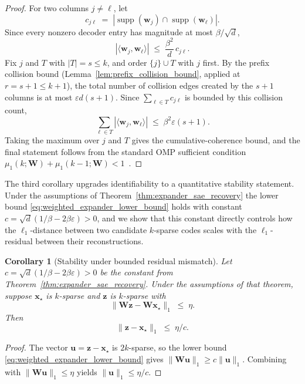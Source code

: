 \documentclass{article}
\theoremstyle{plain}
\newtheorem{corollary}[theorem]{Corollary}
\theoremstyle{definition}
\theoremstyle{remark}
\begin{document}
\begin{proof}
For two columns $j \neq \ell$, let
\[
    c_{j\ell} \;=\; |\operatorname{supp}(\mathbf{w}_j) \cap \operatorname{supp}(\mathbf{w}_\ell)|.
\]
Since every nonzero decoder entry has magnitude at most $\beta / \sqrt{d}$,
\[
    |\langle \mathbf{w}_j, \mathbf{w}_\ell \rangle|
    \;\le\;
    \frac{\beta^2}{d}\, c_{j\ell}.
\]
Fix $j$ and $T$ with $|T| = s \le k$, and order $\{j\} \cup T$ with $j$ first. By the prefix collision bound (Lemma~\ref{lem:prefix_collision_bound}, applied at $r = s + 1 \le k + 1$), the total number of collision edges created by the $s + 1$ columns is at most $\varepsilon d (s + 1)$. Since $\sum_{\ell \in T} c_{j\ell}$ is bounded by this collision count,
\[
    \sum_{\ell \in T} |\langle \mathbf{w}_j, \mathbf{w}_\ell \rangle|
    \;\le\;
    \beta^2 \varepsilon (s + 1).
\]
Taking the maximum over $j$ and $T$ gives the cumulative-coherence bound, and the final statement follows from the standard OMP sufficient condition $\mu_1(k; \mathbf{W}) + \mu_1(k - 1; \mathbf{W}) < 1$~\citep{tropp2004greed}.
\end{proof}

The third corollary upgrades identifiability to a quantitative stability statement. Under the assumptions of Theorem~\ref{thm:expander_sae_recovery} the lower bound \eqref{eq:weighted_expander_lower_bound} holds with constant $c = \sqrt{d}(1/\beta - 2\beta\varepsilon) > 0$, and we show that this constant directly controls how the $\ell_1$-distance between two candidate $k$-sparse codes scales with the $\ell_1$-residual between their reconstructions.

\begin{corollary}[Stability under bounded residual mismatch]
\label{cor:stability}
Let $c = \sqrt{d}(1/\beta - 2\beta\varepsilon) > 0$ be the constant from Theorem~\ref{thm:expander_sae_recovery}. Under the assumptions of that theorem, suppose $\mathbf{x}_\star$ is $k$-sparse and $\mathbf{z}$ is $k$-sparse with
\[
    \|\mathbf{W}\mathbf{z} - \mathbf{W}\mathbf{x}_\star\|_1 \;\le\; \eta.
\]
Then
\[
    \|\mathbf{z} - \mathbf{x}_\star\|_1 \;\le\; \eta / c.
\]
\end{corollary}

\begin{proof}
The vector $\mathbf{u} = \mathbf{z} - \mathbf{x}_\star$ is $2k$-sparse, so the lower bound \eqref{eq:weighted_expander_lower_bound} gives $\|\mathbf{W}\mathbf{u}\|_1 \ge c\|\mathbf{u}\|_1$. Combining with $\|\mathbf{W}\mathbf{u}\|_1 \le \eta$ yields $\|\mathbf{u}\|_1 \le \eta / c$.
\end{proof}
\end{document}

